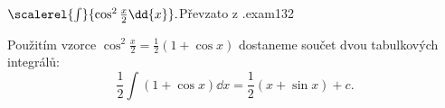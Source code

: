 \begin{mathexam}{\(\scalerel{\int}{\cos^2\frac{x}{2}\dd{x}}.\)\hfill Převzato z
  \cite[s.~30]{Knichal}.}{exam132} 
  
  Použitím vzorce \(\cos^2\frac{x}{2} = \frac{1}{2}(1+\cos x)\) dostaneme součet dvou tabulkových
  integrálů:
  \begin{equation*}
    \frac{1}{2}\int{(1+\cos x)}\dd{x} = \frac{1}{2}(x+\sin x) + c.
  \end{equation*}
\end{mathexam}